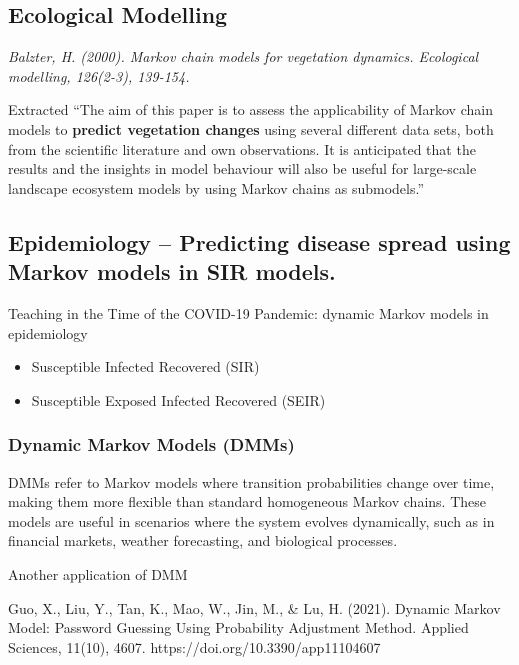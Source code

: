 \documentclass[
  letterpaper,
  DIV=11,
  numbers=noendperiod]{scrreprt}
\begin{document}
\subsection{Ecological Modelling}\label{ecological-modelling}

\emph{Balzter, H. (2000). Markov chain models for vegetation dynamics.
Ecological modelling, 126(2-3), 139-154.}

Extracted ``The aim of this paper is to assess the applicability of
Markov chain models to \textbf{predict vegetation changes} using several
different data sets, both from the scientific literature and own
observations. It is anticipated that the results and the insights in
model behaviour will also be useful for large-scale landscape ecosystem
models by using Markov chains as submodels.''

\subsection{Epidemiology -- Predicting disease spread using Markov
models in SIR
models.}\label{epidemiology-predicting-disease-spread-using-markov-models-in-sir-models.}

Teaching in the Time of the COVID-19 Pandemic: dynamic Markov models in
epidemiology

\begin{itemize}
\item
  Susceptible Infected Recovered (SIR)
\item
  Susceptible Exposed Infected Recovered (SEIR)
\end{itemize}

\subsubsection{Dynamic Markov Models
(DMMs)}\label{dynamic-markov-models-dmms}

DMMs refer to Markov models where transition probabilities change over
time, making them more flexible than standard homogeneous Markov chains.
These models are useful in scenarios where the system evolves
dynamically, such as in financial markets, weather forecasting, and
biological processes.

Another application of DMM

Guo, X., Liu, Y., Tan, K., Mao, W., Jin, M., \& Lu, H. (2021). Dynamic
Markov Model: Password Guessing Using Probability Adjustment Method.
Applied Sciences, 11(10), 4607. https://doi.org/10.3390/app11104607
\end{document}
